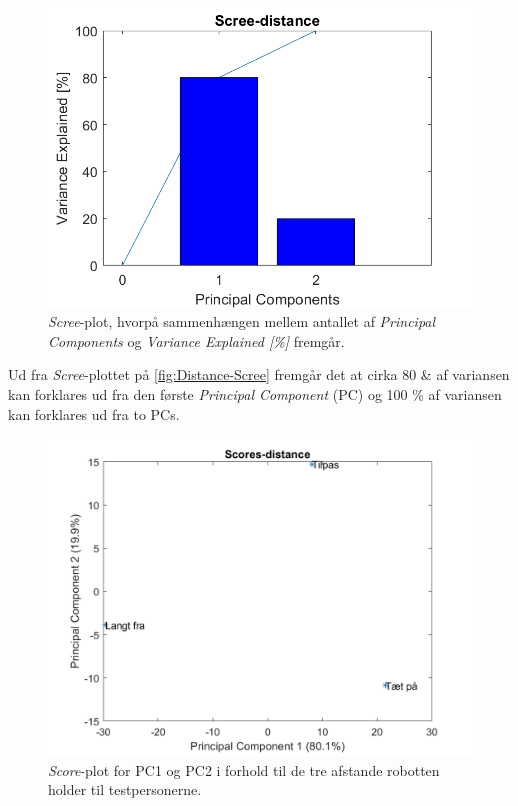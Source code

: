 %
\begin{figure}[H]
\centering
\includegraphics[width=\textwidth]{Figure/DatabehandlingSkalaer/PCAfigures/Distance-Scree.png}
\caption{\textit{Scree}-plot, hvorpå sammenhængen mellem antallet af \textit{Principal Components} og \textit{Variance Explained [\%]} fremgår.}
\label{fig:Distance-Scree}
\end{figure}
\noindent
%
Ud fra \textit{Scree}-plottet på \autoref{fig:Distance-Scree} fremgår det at cirka 80 \& af variansen kan forklares ud fra den første \textit{Principal Component} (PC) og 100 \% af variansen kan forklares ud fra to PCs. 
%
\begin{figure}[H]
\centering
\includegraphics[width=\textwidth]{Figure/DatabehandlingSkalaer/PCAfigures/Distance-Scores}
\caption{\textit{Score}-plot for PC1 og PC2 i forhold til de tre afstande robotten holder til testpersonerne.}
\label{fig:Distance-Score}
\end{figure}
